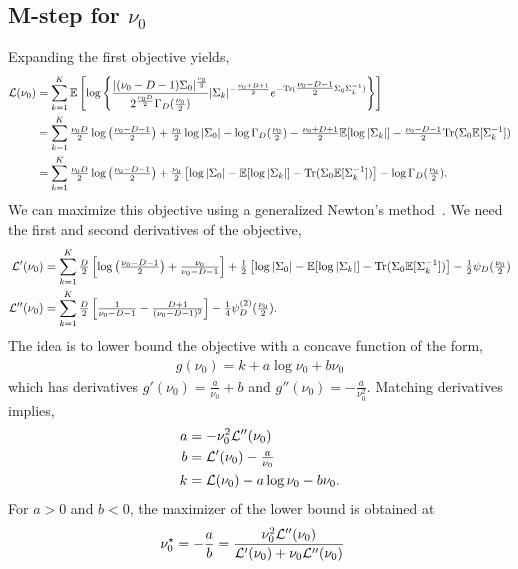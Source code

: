 \subsection{M-step for \texorpdfstring{$\nu_0$}{ν₀}}
Expanding the first objective yields,
\begin{align*}
    \mathcal{L}(\nu_0)
    &= \sum_{k=1}^K \mathbb{E} \left[ \log \left\{ \frac{|(\nu_0 - D - 1)\Sigma_0|^{\frac{\nu_0}{2}}}{2^{\frac{\nu_0 D}{2}} \Gamma_D(\frac{\nu_0}{2}) } |\Sigma_k|^{-\frac{\nu_0 + D + 1}{2}} e^{-\mathrm{Tr}(\tfrac{\nu_0 - D - 1}{2} \Sigma_0 \Sigma_k^{-1})} \right\}  \right] \\
    &= \sum_{k=1}^K  \tfrac{\nu_0 D}{2} \log \left(\tfrac{\nu_0 - D - 1}{2}\right) + \tfrac{\nu_0}{2} \log |\Sigma_0| - \log \Gamma_D(\tfrac{\nu_0}{2}) -\tfrac{\nu_0 + D + 1}{2} \mathbb{E}[\log |\Sigma_k|] - \tfrac{\nu_0 - D - 1}{2} \mathrm{Tr}(\Sigma_0 \mathbb{E}[\Sigma_k^{-1}]) \\
    &= \sum_{k=1}^K  \tfrac{\nu_0 D}{2} \log \left(\tfrac{\nu_0 - D - 1}{2}\right) + \tfrac{\nu_0}{2} \left[\log |\Sigma_0| - \mathbb{E}[\log |\Sigma_k|] - \mathrm{Tr}(\Sigma_0 \mathbb{E}[\Sigma_k^{-1}]) \right] - \log \Gamma_D(\tfrac{\nu_0}{2}).
\end{align*}
We can maximize this objective using a generalized Newton's method~\citep{minka2000beyond}.
We need the first and second derivatives of the objective,
\begin{align*}
    \mathcal{L}'(\nu_0)
    &= \sum_{k=1}^K  \tfrac{D}{2} \left[ \log \left(\tfrac{\nu_0 - D - 1}{2}\right) + \tfrac{\nu_0}{\nu_0 - D - 1} \right] + \tfrac{1}{2} \left[\log |\Sigma_0| - \mathbb{E}[\log |\Sigma_k|] - \mathrm{Tr}(\Sigma_0 \mathbb{E}[\Sigma_k^{-1}]) \right] - \tfrac{1}{2} \psi_D(\tfrac{\nu_0}{2}) \\
    \mathcal{L}''(\nu_0)
    &= \sum_{k=1}^K  \tfrac{D}{2} \left[\tfrac{1}{\nu_0 - D - 1} -  \tfrac{D+1}{(\nu_0 - D - 1)^2}\right] - \tfrac{1}{4} \psi_D^{(2)}(\tfrac{\nu_0}{2}).
\end{align*}
The idea is to lower bound the objective with a concave function of the form,
\begin{align*}
    g(\nu_0) = k + a \log \nu_0 + b \nu_0
\end{align*}
which has derivatives $g'(\nu_0) = \tfrac{a}{\nu_0} + b$ and $g''(\nu_0) = -\tfrac{a}{\nu_0^2}$. Matching derivatives implies,
\begin{align*}
    a &= -\nu_0^2 \mathcal{L}''(\nu_0) \\
    b &= \mathcal{L}'(\nu_0) - \tfrac{a}{\nu_0} \\
    k &= \mathcal{L}(\nu_0) - a\log \nu_0 -b \nu_0.
\end{align*}
For $a > 0$ and $b<0$, the maximizer of the lower bound is obtained at
\begin{align}
    \nu_0^\star
    &= -\frac{a}{b} = \frac{\nu_0^2 \mathcal{L}''(\nu_0)}{\mathcal{L}'(\nu_0) + \nu_0 \mathcal{L}''(\nu_0)}
\end{align}

